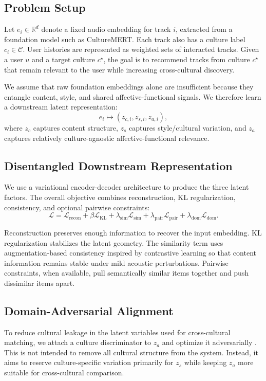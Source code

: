 \documentclass[10pt,twocolumn]{article}
\begin{document}
\subsection{Problem Setup}
Let $e_i \in \mathbb{R}^d$ denote a fixed audio embedding for track $i$, extracted from a foundation model such as CultureMERT.
Each track also has a culture label $c_i \in \mathcal{C}$.
User histories are represented as weighted sets of interacted tracks.
Given a user $u$ and a target culture $c^\star$, the goal is to recommend tracks from culture $c^\star$ that remain relevant to the user while increasing cross-cultural discovery.

We assume that raw foundation embeddings alone are insufficient because they entangle content, style, and shared affective-functional signals.
We therefore learn a downstream latent representation:
\begin{equation}
e_i \mapsto (z_{c,i}, z_{s,i}, z_{a,i}),
\end{equation}
where $z_c$ captures content structure, $z_s$ captures style/cultural variation, and $z_a$ captures relatively culture-agnostic affective-functional relevance.

\subsection{Disentangled Downstream Representation}
We use a variational encoder-decoder architecture to produce the three latent factors.
The overall objective combines reconstruction, KL regularization, consistency, and optional pairwise constraints:
\begin{equation}
\mathcal{L} =
\mathcal{L}_{\text{recon}}
+ \beta \mathcal{L}_{\text{KL}}
+ \lambda_{\text{sim}} \mathcal{L}_{\text{sim}}
+ \lambda_{\text{pair}} \mathcal{L}_{\text{pair}}
+ \lambda_{\text{dom}} \mathcal{L}_{\text{dom}}.
\end{equation}

Reconstruction preserves enough information to recover the input embedding.
KL regularization stabilizes the latent geometry.
The similarity term uses augmentation-based consistency inspired by contrastive learning \citep{oord2018cpc} so that content information remains stable under mild acoustic perturbations.
Pairwise constraints, when available, pull semantically similar items together and push dissimilar items apart.

\subsection{Domain-Adversarial Alignment}
To reduce cultural leakage in the latent variables used for cross-cultural matching, we attach a culture discriminator to $z_a$ and optimize it adversarially \citep{ganin2016dann}.
This is not intended to remove all cultural structure from the system.
Instead, it aims to reserve culture-specific variation primarily for $z_s$ while keeping $z_a$ more suitable for cross-cultural comparison.
\end{document}
